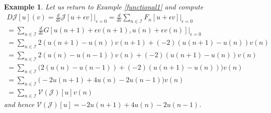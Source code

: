 \documentclass[sigconf,twocolumn]{acmart}
\newcommand{\1}{{\chi}}
\newcommand{\Ii}{{\mathcal{I}}}
\numberwithin{equation}{section}
\theoremstyle{thmlemcorr}
\numberwithin{theorem}{section}
\theoremstyle{thmlemcorr*}
\theoremstyle{defi}
\theoremstyle{remexample}
\newtheorem{example}[theorem]{Example}
\theoremstyle{ass}
\begin{document}
\begin{example}
	Let us return to Example \ref{functional1} and compute
	\begin{gather*}
		D\mathcal{J}[u](v)=\frac{d}{d\epsilon}\mathcal{J}[u+\epsilon v]\bigg|_{\epsilon=0}=\frac{d}{d\epsilon}\sum_{n\in\Ii}F_n[u+\epsilon v]\bigg|_{\epsilon=0}\\
		=\sum_{n\in\Ii}\frac{d}{d\epsilon}G[u(n+1)+\epsilon v(n+1),u(n)+\epsilon v(n)]\bigg|_{\epsilon=0}\\
		=\sum_{n\in\Ii}2(u(n+1)-u(n))v(n+1)+(-2)(u(n+1)-u(n))v(n)\\
		=\sum_{n\in\Ii}2(u(n)-u(n-1))v(n)+(-2)(u(n+1)-u(n))v(n)\\
		=\sum_{n\in\Ii}\Big(2(u(n)-u(n-1))+(-2)(u(n+1)-u(n))\Big)v(n)\\
		=\sum_{n\in\Ii}\Big(-2u(n+1)+4u(n)-2u(n-1)\Big)v(n)\\
		=\sum_{n\in\Ii}\mathcal{V}(\mathcal{J})[u]v(n)
	\end{gather*}
	and hence $\mathcal{V}(\mathcal{J})[u]=-2u(n+1)+4u(n)-2u(n-1)$.
\end{example}
\end{document}
